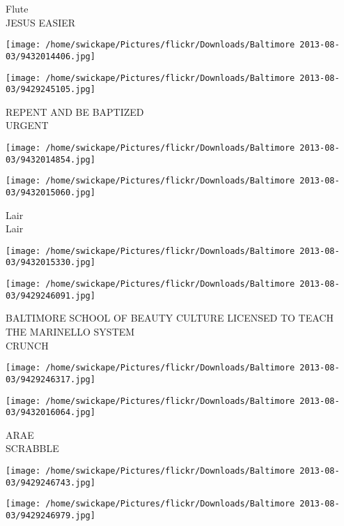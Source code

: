 \documentclass[10pt,letterpaper]{article}
\begin{document}
Flute\\
JESUS EASIER\\
\pagebreak

\texttt{[image: /home/swickape/Pictures/flickr/Downloads/Baltimore 2013-08-03/9432014406.jpg]}

\vspace{0.25in}
\texttt{[image: /home/swickape/Pictures/flickr/Downloads/Baltimore 2013-08-03/9429245105.jpg]}

REPENT AND BE BAPTIZED\\
URGENT\\
\pagebreak

\texttt{[image: /home/swickape/Pictures/flickr/Downloads/Baltimore 2013-08-03/9432014854.jpg]}

\vspace{0.25in}
\texttt{[image: /home/swickape/Pictures/flickr/Downloads/Baltimore 2013-08-03/9432015060.jpg]}

Lair\\
Lair\\
\pagebreak

\texttt{[image: /home/swickape/Pictures/flickr/Downloads/Baltimore 2013-08-03/9432015330.jpg]}

\vspace{0.25in}
\texttt{[image: /home/swickape/Pictures/flickr/Downloads/Baltimore 2013-08-03/9429246091.jpg]}

BALTIMORE SCHOOL OF BEAUTY CULTURE LICENSED TO TEACH THE MARINELLO SYSTEM\\
CRUNCH\\
\pagebreak

\texttt{[image: /home/swickape/Pictures/flickr/Downloads/Baltimore 2013-08-03/9429246317.jpg]}

\vspace{0.25in}
\texttt{[image: /home/swickape/Pictures/flickr/Downloads/Baltimore 2013-08-03/9432016064.jpg]}

ARAE\\
SCRABBLE\\
\pagebreak

\texttt{[image: /home/swickape/Pictures/flickr/Downloads/Baltimore 2013-08-03/9429246743.jpg]}

\vspace{0.25in}
\texttt{[image: /home/swickape/Pictures/flickr/Downloads/Baltimore 2013-08-03/9429246979.jpg]}
\end{document}
